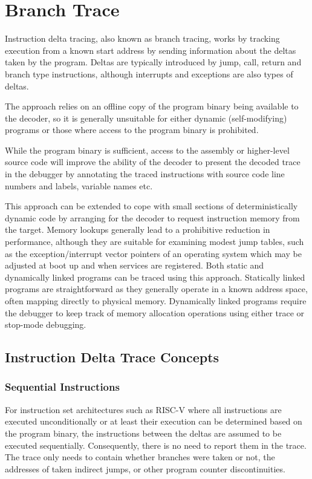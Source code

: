 \chapter{Branch Trace} \label{Branch Trace}


Instruction delta tracing, also known as branch tracing, works by
tracking execution from a known start address by sending information
about the deltas taken by the program. Deltas are typically introduced
by jump, call, return and branch type instructions, although
interrupts and exceptions are also types of deltas.

The approach relies on
an offline copy of the program binary being available to the decoder, so it
is generally unsuitable for either dynamic (self-modifying) programs
or those where access to the program binary is prohibited.

While the program binary is sufficient, access to the assembly or
higher-level source code will improve the ability of the decoder to present
the decoded trace in the debugger by annotating the traced instructions with
source code line numbers and labels, variable names etc.

This approach can be extended to cope with small sections of
deterministically dynamic code by arranging for the decoder to request
instruction memory from the target. Memory lookups generally lead to a
prohibitive reduction in performance, although they are suitable for
examining modest jump tables, such as the exception/interrupt vector
pointers of an operating system which may be adjusted at boot up and
when services are registered.  Both static and dynamically linked
programs can be traced using this approach. Statically linked programs
are straightforward as they generally operate in a known address
space, often mapping directly to physical memory. Dynamically linked
programs require the debugger to keep track of memory allocation
operations using either trace or stop-mode debugging.

\section{Instruction Delta Trace Concepts} \label{Trace Concepts}

\subsection{Sequential Instructions} \label{Sequential Instructions}

For instruction set architectures such as RISC-V where all instructions are executed
unconditionally or at least their execution can be determined based on
the program binary, the instructions between the deltas are assumed to be
executed sequentially. Consequently, there is no need
to report them in the trace. The trace only needs to contain whether
branches were taken or not, the addresses of taken indirect jumps, or
other program counter discontinuities.

